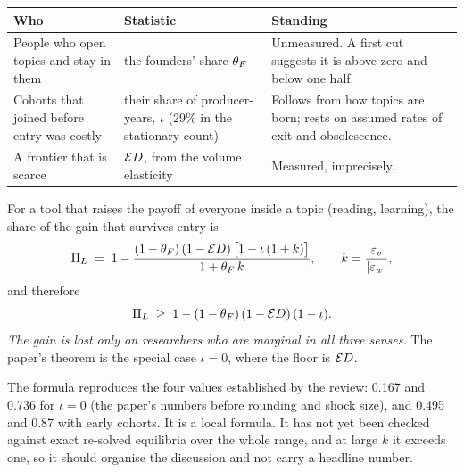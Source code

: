 \begin{center}\small
\begin{tabularx}{\textwidth}{@{}P{1.6in}P{1.4in}L@{}}
\toprule
Who & Statistic & Standing \\
\midrule
People who open topics and stay in them & the founders' share $\theta_F$ & Unmeasured. A first cut suggests it is above zero and below one half. \\
Cohorts that joined before entry was costly & their share of producer-years, $\iota$ (29\% in the stationary count) & Follows from how topics are born; rests on assumed rates of exit and obsolescence. \\
A frontier that is scarce & $\mathcal{E} D$, from the volume elasticity & Measured, imprecisely. \\
\bottomrule
\end{tabularx}
\end{center}

\begin{ideabox}
For a tool that raises the payoff of everyone inside a topic (reading, learning), the share of the gain that survives entry is
\[
\Pi_L \;=\; 1-\frac{(1-\theta_F)\,(1-\mathcal{E} D)\,\bigl[1-\iota\,(1+k)\bigr]}{1+\theta_F\,k},\qquad k=\frac{\varepsilon_v}{|\varepsilon_w|},
\]
and therefore
\[
\Pi_L\;\ge\;1-(1-\theta_F)\,(1-\mathcal{E} D)\,(1-\iota).
\]
\emph{The gain is lost only on researchers who are marginal in all three senses.} The paper's theorem is the special case $\iota=0$, where the floor is $\mathcal{E} D$.

The formula reproduces the four values established by the review: 0.167 and 0.736 for $\iota=0$ (the paper's numbers before rounding and shock size), and 0.495 and 0.87 with early cohorts. It is a local formula. It has not yet been checked against exact re-solved equilibria over the whole range, and at large $k$ it exceeds one, so it should organise the discussion and not carry a headline number.
\end{ideabox}


